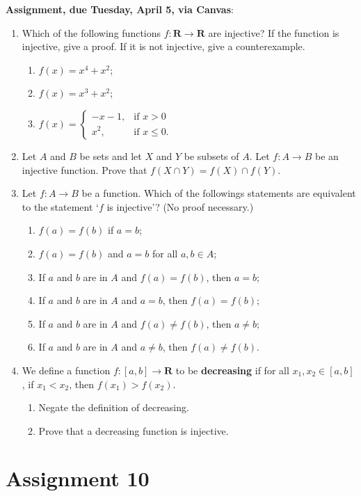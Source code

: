 \documentclass[12pt]{article}
\begin{document}
\noindent \textbf{Assignment, due Tuesday, April 5, via Canvas}:
\begin{enumerate}
\item Which of the following functions $f \colon \mathbf{R}\to \mathbf{R}$ are injective? If the function is injective, give a proof. If it is not injective, give a counterexample.
 \begin{enumerate}
 \item $f(x) = x^4 + x^2$;
 \item $f(x) = x^3 + x^2$;
 \item $f(x) =
 \begin{cases}
 -x-1, & \text{if $x > 0$} \\
 x^2, & \text{if $x \leq 0$}.
 \end{cases}
 $ 
 \end{enumerate}
\item Let $A$ and $B$ be sets and let $X$ and $Y$ be subsets of $A$. Let $f \colon A \to B$ be an injective function. Prove that $f(X \cap Y) = f(X) \cap f(Y)$.
\item Let $f \colon A \to B$ be a function. Which of the followings statements are equivalent to the statement `$f$ is injective'? (No proof necessary.)
 \begin{enumerate}
 \item $f(a) = f(b)$ if $a = b$;
 \item $f(a) = f(b)$ and $a = b$ for all $a,b \in A$;
 \item If $a$ and $b$ are in $A$ and $f(a) = f(b)$, then $a = b$;
 \item If $a$ and $b$ are in $A$ and $a = b$, then $f(a) = f(b)$;
 \item If $a$ and $b$ are in $A$ and $f(a) \neq f(b)$, then $a \neq b$;
 \item If $a$ and $b$ are in $A$ and $a \neq b$, then $f(a) \neq f(b)$. 
 \end{enumerate}
\item We define a function $f\colon [a,b] \to \mathbf{R}$ to be \textbf{decreasing} if for all $x_1,x_2 \in [a,b]$, if $x_1 < x_2$, then $f(x_1) > f(x_2)$.
 \begin{enumerate}
 \item Negate the definition of decreasing.
 \item Prove that a decreasing function is injective.
 \end{enumerate}
\end{enumerate}


\newpage
\section[10 (due April 12): Composition of functions.]{Assignment 10}
\end{document}
